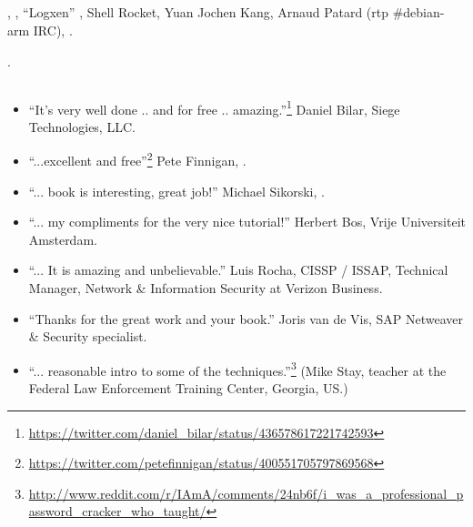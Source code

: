 \subsection*{}

\HERMIT, 
,  ``Logxen'' ,
Shell Rocket, Yuan Jochen Kang, Arnaud Patard (rtp  \#debian-arm IRC), 
.

.

\subsection*{}

\begin{itemize}
\item ``It's very well done .. and for free .. amazing.''\footnote{\url{https://twitter.com/daniel_bilar/status/436578617221742593}} Daniel Bilar, Siege Technologies, LLC.

\item ``...excellent and free''\footnote{\url{https://twitter.com/petefinnigan/status/400551705797869568}} Pete Finnigan, \oracle{}.

\item ``... book is interesting, great job!'' Michael Sikorski,  .

\item ``... my compliments for the very nice tutorial!'' Herbert Bos,  Vrije Universiteit Amsterdam.

\item ``... It is amazing and unbelievable.'' Luis Rocha, CISSP / ISSAP, Technical Manager, Network \& Information Security at Verizon Business.

\item ``Thanks for the great work and your book.'' Joris van de Vis, SAP Netweaver \& Security specialist.

\item ``... reasonable intro to some of the techniques.''\footnote{\url{http://www.reddit.com/r/IAmA/comments/24nb6f/i_was_a_professional_password_cracker_who_taught/}} (Mike Stay, teacher at the Federal Law Enforcement Training Center, Georgia, US.)

\end{itemize}

